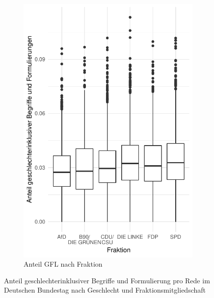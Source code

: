 \documentclass[12pt, 
    twoside=false, 
    bibliography=totoc, 
    numbers=endperiod, 
    headings=normal, 
    toc=chapterentrydotfill
    ]{scrbook}
\begin{document}
\begin{figure}[H]
\begin{subfigure}{.5\textwidth}
      \includegraphics[width=.9\linewidth]{images/boxplot_gfl_fraktion.pdf}
      \caption{Anteil GFL nach Fraktion}
      \label{fig:boxplot_gfl_fraktion}
    \end{subfigure}
    \caption[Anteil geschlechterinklusiver Begriffe und Formulierung pro Rede im Deutschen Bundestag]{Anteil geschlechterinklusiver Begriffe und Formulierung pro Rede im Deutschen Bundestag nach Geschlecht und Fraktionsmitgliedschaft}
    \label{fig:boxplot_gfl}
\end{figure}
\end{document}
